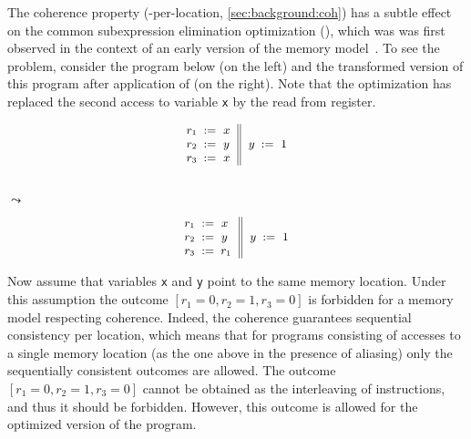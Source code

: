 The coherence property (\ie \SC-per-location, \cref{sec:background:coh})
has a subtle effect on the common subexpression elimination optimization (\CSE),
which was was first observed in the context of an early version of the \Java 
memory model~\cite{Pugh:JAVA99}.
To see the problem, consider the program below
(on the left) and the transformed version 
of this program after application of \CSE (on the right).
Note that the optimization has replaced 
the second access to variable \texttt{x}
by the read from register. 

\begin{minipage}{0.45\linewidth}
\begin{equation*}
\small
\inarrII{
  \readInst{}{r_1}{x}      \\
  \readInst{}{r_2}{y}      \\
  \readInst{}{r_3}{x}      \\
}{
  \writeInst{}{y}{1}       \\
}
\label{ex:coh-rr}
\end{equation*}
\end{minipage}\hfill%
\begin{minipage}{0.05\linewidth}
\Large~\\ $\leadsto$
\end{minipage}\hfill%
\begin{minipage}{0.45\linewidth}
\begin{equation*}
\small
\inarrII{
  \readInst{}{r_1}{x}      \\
  \readInst{}{r_2}{y}      \\
  \assignInst{r_3}{r_1}    \\
}{
  \writeInst{}{y}{1}       \\
}
\label{ex:coh-rr}
\end{equation*}
\end{minipage}

Now assume that variables \texttt{x} and \texttt{y} 
point to the same memory location.
Under this assumption the outcome $[r_1=0, r_2=1, r_3=0]$
is forbidden for a memory model respecting coherence.
Indeed, the coherence guarantees sequential consistency per location, 
which means that for programs consisting of accesses 
to a single memory location 
(as the one above in the presence of aliasing) 
only the sequentially consistent outcomes are allowed.
The outcome $[r_1=0, r_2=1, r_3=0]$ cannot be obtained 
as the interleaving of instructions, and thus 
it should be forbidden.  
However, this outcome is allowed for 
the optimized version of the program. 

